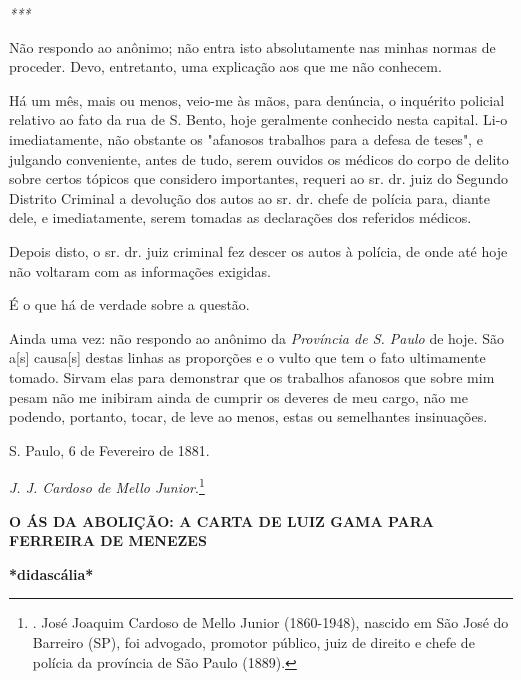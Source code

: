 \emph{*** }

Não respondo ao anônimo; não entra isto absolutamente nas minhas normas
de proceder. Devo, entretanto, uma explicação aos que me não conhecem.

Há um mês, mais ou menos, veio-me às mãos, para denúncia, o inquérito
policial relativo ao fato da rua de S. Bento, hoje geralmente conhecido
nesta capital. Li-o imediatamente, não obstante os "afanosos trabalhos
para a defesa de teses", e julgando conveniente, antes de tudo, serem
ouvidos os médicos do corpo de delito sobre certos tópicos que considero
importantes, requeri ao sr. dr. juiz do Segundo Distrito Criminal a
devolução dos autos ao sr. dr. chefe de polícia para, diante dele, e
imediatamente, serem tomadas as declarações dos referidos médicos.

Depois disto, o sr. dr. juiz criminal fez descer os autos à polícia, de
onde até hoje não voltaram com as informações exigidas.

É o que há de verdade sobre a questão.

Ainda uma vez: não respondo ao anônimo da \emph{Província de S. Paulo}
de hoje. São a{[}s{]} causa{[}s{]} destas linhas as proporções e o vulto
que tem o fato ultimamente tomado. Sirvam elas para demonstrar que os
trabalhos afanosos que sobre mim pesam não me inibiram ainda de cumprir
os deveres de meu cargo, não me podendo, portanto, tocar, de leve ao
menos, estas ou semelhantes insinuações.

S. Paulo, 6 de Fevereiro de 1881.

\emph{J. J. Cardoso de Mello Junior}.\footnote{. José Joaquim Cardoso de
  Mello Junior (1860-1948), nascido em São José do Barreiro (SP), foi
  advogado, promotor público, juiz de direito e chefe de polícia da
  província de São Paulo (1889).}

\textbf{O ÁS DA ABOLIÇÃO: A
CARTA DE LUIZ GAMA PARA FERREIRA DE MENEZES }

\textbf{*didascália*}

